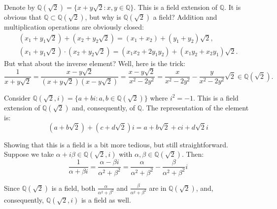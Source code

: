 \documentclass[../lecture-notes.tex]{subfiles}
\begin{document}
\begin{example}
    Denote by $\mathbb{Q}(\sqrt{2}) = \{x + y\sqrt{2}: x,y \in \mathbb{Q}\}$. This is a field extension of $\mathbb{Q}$. It is obvious that $\mathbb{Q} \subset \mathbb{Q}(\sqrt{2})$, but why is $\mathbb{Q}(\sqrt{2})$ a field? Addition and multiplication operations are obviously closed:
    \begin{equation}
        \begin{aligned}
            (x_1+y_1\sqrt{2}) + (x_2+y_2\sqrt{2}) = (x_1+x_2) + (y_1+y_2)\sqrt{2},\\
            (x_1+y_1\sqrt{2}) \cdot (x_2+y_2\sqrt{2}) = (x_1x_2+2y_1y_2) + (x_1y_2+x_2y_1)\sqrt{2}.
        \end{aligned}
    \end{equation}
    But what about the inverse element? Well, here is the trick:
    \begin{equation}
        \frac{1}{x+y\sqrt{2}} = \frac{x-y\sqrt{2}}{(x+y\sqrt{2})(x-y\sqrt{2})} = \frac{x-y\sqrt{2}}{x^2-2y^2} = \frac{x}{x^2-2y^2} - \frac{y}{x^2-2y^2}\sqrt{2} \in \mathbb{Q}(\sqrt{2}).
    \end{equation}
\end{example}

\begin{example}
    Consider $\mathbb{Q}(\sqrt{2}, i) = \{a+bi: a,b \in \mathbb{Q}(\sqrt{2})\}$ where $i^2=-1$. This is a field extension of $\mathbb{Q}(\sqrt{2})$ and, consequently, of $\mathbb{Q}$. The representation of the element is:
    \begin{equation}
        (a+b\sqrt{2}) + (c+d\sqrt{2})i = a + b\sqrt{2} + ci + d\sqrt{2}i
    \end{equation}

    Showing that this is a field is a bit more tedious, but still straightforward. Suppose we take $\alpha+i\beta \in \mathbb{Q}(\sqrt{2}, i)$ with $\alpha,\beta \in \mathbb{Q}(\sqrt{2})$. Then:
    \begin{equation}
        \frac{1}{\alpha+\beta i} = \frac{\alpha-\beta i}{\alpha^2+\beta^2} = \frac{\alpha}{\alpha^2+\beta^2} - \frac{\beta}{\alpha^2+\beta^2}i
    \end{equation}

    Since $\mathbb{Q}(\sqrt{2})$ is a field, both $\frac{\alpha}{\alpha^2+\beta^2}$ and $\frac{\beta}{\alpha^2+\beta^2}$ are in $\mathbb{Q}(\sqrt{2})$, and, consequently, $\mathbb{Q}(\sqrt{2}, i)$ is a field as well.
\end{example}
\end{document}

